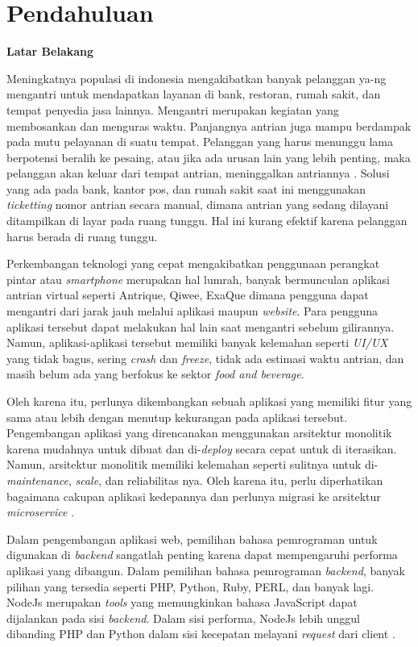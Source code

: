 
\section{Pendahuluan}

\noindent\textbf{Latar Belakang}

Meningkatnya populasi di indonesia mengakibatkan banyak pelanggan ya-ng mengantri untuk mendapatkan layanan di bank, restoran, rumah sakit, dan tempat penyedia jasa lainnya. Mengantri merupakan kegiatan yang membosankan dan menguras waktu. Panjangnya antrian juga mampu berdampak pada mutu pelayanan di suatu tempat. Pelanggan yang harus menunggu lama berpotensi beralih ke pesaing, atau jika ada urusan lain yang lebih penting, maka pelanggan akan keluar dari tempat antrian, meninggalkan antriannya \cite{khong2017queue}\cite{Ghazal2016}\cite{Uddin2016}. Solusi yang ada pada bank, kantor pos, dan rumah sakit saat ini menggunakan \textit{ticketting} nomor antrian secara manual, dimana antrian yang sedang dilayani ditampilkan di layar pada ruang tunggu. Hal ini kurang efektif karena pelanggan harus berada di ruang tunggu\cite{Ghazal2016}.

Perkembangan teknologi yang cepat mengakibatkan penggunaan perangkat pintar atau \textit{smartphone} merupakan hal lumrah, banyak bermunculan aplikasi antrian virtual seperti Antrique, Qiwee, ExaQue dimana pengguna dapat mengantri dari jarak jauh melalui aplikasi maupun \textit{website}. Para pengguna aplikasi tersebut dapat melakukan hal lain saat mengantri sebelum gilirannya. Namun, aplikasi-aplikasi tersebut memiliki banyak kelemahan seperti \textit{UI/UX} yang tidak bagus, sering \textit{crash} dan \textit{freeze}, tidak ada estimasi waktu antrian, dan masih belum ada yang berfokus ke sektor \textit{food and beverage}.

Oleh karena itu, perlunya dikembangkan sebuah aplikasi yang memiliki fitur yang sama atau lebih dengan menutup kekurangan pada aplikasi tersebut. Pengembangan aplikasi yang direncanakan menggunakan arsitektur monolitik karena mudahnya untuk dibuat dan di-\textit{deploy} secara cepat untuk di iterasikan. Namun, arsitektur monolitik memiliki kelemahan seperti sulitnya untuk di-\textit{maintenance}, \textit{scale}, dan reliabilitas nya. Oleh karena itu, perlu diperhatikan bagaimana cakupan aplikasi kedepannya dan perlunya migrasi ke arsitektur \textit{microservice} \cite{gos2020comparison} \cite{jatkiewicz2023differences}.

Dalam pengembangan aplikasi web, pemilihan bahasa pemrograman untuk digunakan di \textit{backend} sangatlah penting karena dapat mempengaruhi performa aplikasi yang dibangun. Dalam pemilihan bahasa pemrograman \textit{backend}, banyak pilihan yang tersedia seperti PHP, Python, Ruby, PERL, dan banyak lagi. NodeJs merupakan \textit{tools} yang memungkinkan bahasa JavaScript dapat dijalankan pada sisi \textit{backend}. Dalam sisi performa, NodeJs lebih unggul dibanding PHP dan Python dalam sisi kecepatan melayani \textit{request} dari client \cite{William2020} \cite{Odeniran2023}.

